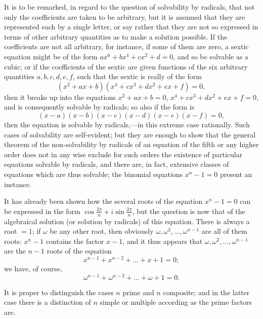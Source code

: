 \documentclass[11pt,a4paper]{article}
\begin{document}
It is to be remarked, in regard to the question of solvability by radicals, that not only the coefficients are taken to be arbitrary, but it is assumed that they are represented each by a single letter, or say rather that they are not so expressed in terms of other arbitrary quantities as to make a solution possible. If the coefficients are not all arbitrary, for instance, if some of them are zero, a sextic equation might be of the form $ax^{6} + bx^{4} + cx^{2} + d = 0$, and so be solvable as a cubic; or if the coefficients of the sextic are given functions of the six arbitrary quantities $a, b, c, d, e, f$, such that the sextic is really of the form
\[
(x^{2} + ax + b)(x^{4} + cx^{3} + dx^{2} + ex + f) = 0,
\]
then it breaks up into the equations $x^{2} + ax + b = 0$, $x^{4} + cx^{3} + dx^{2} + ex + f = 0$, and is consequently solvable by radicals; so also if the form is
\[
(x - a)(x - b)(x - c)(x - d)(x - e)(x - f) = 0,
\]
then the equation is solvable by radicals,---in this extreme case rationally. Such cases of solvability are self-evident; but they are enough to show that the general theorem of the non-solvability by radicals of an equation of the fifth or any higher order does not in any wise exclude for such orders the existence of particular equations solvable by radicals, and there are, in fact, extensive classes of equations which are thus solvable; the binomial equations $x^{n} - 1 = 0$ present an instance.

It has already been shown how the several roots of the equation $x^{n} - 1 = 0$ can be expressed in the form $\cos\frac{2\pi}{n} + i\sin\frac{2\pi}{n}$, but the question is now that of the algebraical solution (or solution by radicals) of this equation. There is always a root $= 1$; if $\omega$ be any other root, then obviously $\omega, \omega^{2}, \ldots, \omega^{n-1}$ are all of them roots: $x^{n} - 1$ contains the factor $x - 1$, and it thus appears that $\omega, \omega^{2}, \ldots, \omega^{n-1}$ are the $n - 1$ roots of the equation
\[
x^{n-1} + x^{n-2} + \ldots + x + 1 = 0;
\]
we have, of course,
\[
\omega^{n-1} + \omega^{n-2} + \ldots + \omega + 1 = 0.
\]

It is proper to distinguish the cases $n$ prime and $n$ composite; and in the latter case there is a distinction of $n$ simple or multiple according as the prime factors are.
\end{document}
